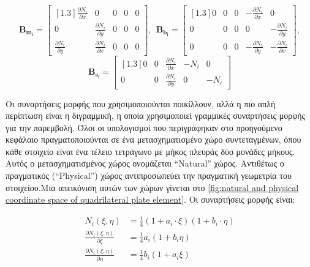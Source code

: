 \[
\mathbf{B_{m_{i}}} =\begin{bmatrix}[1.3]

\frac{\partial N_{i}}{\partial x} & 0 & 0 & 0 & 0 \\
0 & \frac{\partial N_{i}}{\partial y} & 0 & 0 & 0 \\
\frac{\partial N_{i}}{\partial y} & \frac{\partial N_{i}}{\partial x} & 0 & 0 & 0
\end{bmatrix},\ \ 
\mathbf{B_{b_{i}}}=\begin{bmatrix}[1.3]
0 & 0 & 0 & - \frac{\partial N_{i}}{\partial x} & 0 \\
0 & 0 & 0 & 0 & - \frac{\partial N_{i}}{\partial y} \\
0 & 0 & 0 & - \frac{\partial N_{i}}{\partial y} & - \frac{\partial N_{i}}{\partial x}
\end{bmatrix},\]
\[
\mathbf{B_{s_{i}}}=\begin{bmatrix}[1.3]
0 & 0 & \frac{\partial N_{i}}{\partial x} & - N_{i} & 0 \\
0 & 0 & \frac{\partial N_{i}}{\partial y} & 0 & - N_{i}
\end{bmatrix}
\]


Οι συναρτήσεις μορφής που χρησιμοποιούνται ποικίλλουν, αλλά η πιο απλή περίπτωση είναι η διγραμμική, η οποία χρησιμοποιεί γραμμικές συναρτήσεις μορφής για την παρεμβολή. Όλοι οι υπολογισμοί που περιγράφηκαν στο προηγούμενο κεφάλαιο πραγματοποιούνται σε ένα μετασχηματισμένο χώρο συντεταγμένων, όπου κάθε στοιχείο είναι ένα τέλειο τετράγωνο με μήκος πλευράς δύο μονάδες μήκους. Αυτός ο μετασχηματισμένος χώρος ονομάζεται \textlatin{``Natural''} χώρος. Αντιθέτως ο πραγματικός \textlatin{(``Physical'')} χώρος αντιπροσωπεύει την πραγματική γεωμετρία του στοιχείου.Μια απεικόνιση αυτών των χώρων γίνεται στο \autoref{fig:natural and physical coordinate space of quadrilateral plate element}. Οι συναρτήσεις μορφής είναι:

\begin{align}
  N_{i}(\xi,\eta) &= \frac{1}{4}(1 + a_{i} \cdot \xi)(1 + b_{i} \cdot \eta) \label{eq:N_i} \\
  \frac{\partial N_{i}(\xi,\eta)}{\partial\xi} &= \frac{1}{4}a_{i}\left( 1 + b_{i}\eta \right) \label{eq:dNdxi} \\
  \frac{\partial N_{i}(\xi,\eta)}{\partial\eta} &= \frac{1}{4}b_{i}\left( 1 + a_{i}\xi \right) \label{eq:dNdeta}
\end{align}


